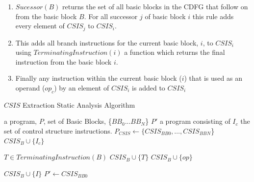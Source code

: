 \begin{enumerate}
    \setlength{\itemsep}{3pt}
    \setlength{\parskip}{0pt}
    \setlength{\parsep}{0pt}
    \item $\mathit{Sucessor(B)}$ returns the set of all basic blocks in the CDFG that follow on from the basic block $B$.
	  For all successor  $j$ of basic block $i$ this rule adds every element of $\mathit{CSIS}_j$ to $\mathit{CSIS}_i$.
    \item This adds all branch instructions for the current basic block, $i$, to $\mathit{CSIS}_i$ using
	  $\mathit{TerminatingInstruction(i)}$ a function which returns the final instruction from the basic block $i$.
    \item Finally any instruction within the current basic block ($i$) that is used as an operand ($\mathit{op_{c}}$) by an element of $\mathit{CSIS}_i$ is added to $\mathit{CSIS}_i$
\end{enumerate}
\vspace{-4pt}

\begin{algorithm}[t]
\caption{$\mathit{CSIS}$ Extraction Static Analysis Algorithm
\label{alg:CSIS-extraction}}
    \begin{algorithmic}[1]
        \INPUT a program, $P$, set of Basic Blocks, \{$\mathit{BB}_0$...$\mathit{BB}_N$\}
        \OUTPUT $P'$ a program consisting of $I_c$ the set of control structure instructions.
        \Statex
            \State $P_{\mathit{CSIS}} \gets \{\mathit{CSIS}_{\mathit{BB0}}, \dots,  \mathit{CSIS}_{BBN}$\}
                \\\hrulefill
                        \State $\mathit{CSIS}_B \cup \{I_{c}\}$
                    \EndFor
                \EndFor
                \\\hrulefill

                \State $T \in TerminatingInstruction(B)$
                \State $\mathit{CSIS}_{B} \cup \{T\}$
                    \State $\mathit{CSIS}_{B} \cup \{op\}$
                \EndFor
                \\\hrulefill

                                \State $\mathit{CSIS}_{B} \cup \{I\}$
                            \EndIf
                        \EndFor
                    \EndFor
                \EndFor
            \EndFor
	\State $P' \gets \mathit{CSIS}_{\mathit{BB0}}$
        \EndWhile
    \end{algorithmic}
\end{algorithm}

